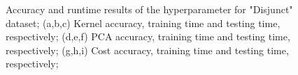 \documentclass[conference]{IEEEtran}
\begin{document}
\begin{figure}[ht!]
    \quad
    \quad
    \quad

    \caption{
        \color{maxim}
        Accuracy and runtime results of the hyperparameter for "Disjunct" dataset; (a,b,c) Kernel accuracy, training time and testing time, respectively; (d,e,f) PCA accuracy, training time and testing time, respectively; (g,h,i) Cost accuracy, training time and testing time, respectively;
    }
    \label{fig:hyper:svm_param_allin}
\end{figure}
\end{document}
